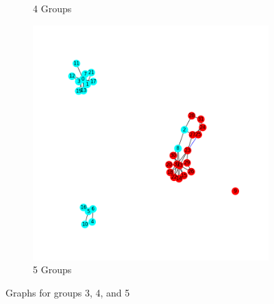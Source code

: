 \documentclass[11pt]{article} %
\begin{document}
\begin{figure}[h!]
\begin{subfigure}[b]{0.5\linewidth}
    \caption{4 Groups}
  \end{subfigure}
  \begin{subfigure}[b]{0.5\linewidth}
    \includegraphics[width=\linewidth]{../Figures/5_communities.png}
    \caption{5 Groups}
  \end{subfigure}
\caption{Graphs for groups 3, 4, and 5}
  \label{../Figures/Iteration1.png}
\end{figure}
\end{document}
